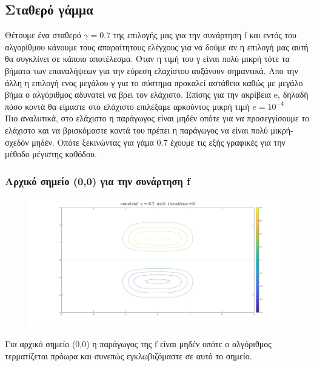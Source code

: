 \documentclass{article}
\begin{document}
\subsection*{Σταθερό γάμμα}
Θέτουμε ένα σταθερό $\boxed{γ=0.7}$ της επιλογής μας για την συνάρτηση f και εντός του αλγορίθμου κάνουμε τους απαραίτητους ελέγχους για να δούμε αν η επιλογή μας αυτή θα συγκλίνει σε κάποιο αποτέλεσμα. Όταν η τιμή του γ είναι πολύ μικρή τότε τα βήματα των επαναλήψεων για την εύρεση ελαχίστου αυξάνουν σημαντικά. Απο την άλλη η επιλογή ενος μεγάλου γ για το σύστημα προκαλεί αστάθεια καθώς με μεγάλο βήμα ο αλγόριθμος αδυνατεί να βρει τον ελάχιστο. Επίσης για την ακρίβεια e, δηλαδή πόσο κοντά θα είμαστε στο ελάχιστο επιλέξαμε αρκούντος μικρή τιμή $\boxed{e = 10^{-4}}$\\Πιο αναλυτικά, στο ελάχιστο η παράγωγος είναι μηδέν οπότε για να προσεγγίσουμε το ελάχιστο και να βρισκόμαστε κοντά του πρέπει η παράγωγος να είναι πολύ μικρή-σχεδόν μηδέν. 
Οπότε ξεκινώντας για γάμα 0.7 έχουμε τις εξής γραφικές για την μέθοδο μέγιστης καθόδου.
\clearpage
\subsubsection*{Αρχικό σημείο (0,0) για την συνάρτηση f}
\begin{figure}[h!]	
     \centering  
     \advance\leftskip-0.2cm  
  \includegraphics[width=140mm,scale=2]{t1a.jpg}
\end{figure} 
Για αρχικό σημείο (0,0) η παράγωγος της f είναι μηδέν οπότε ο αλγόριθμος τερματίζεται πρόωρα και συνεπώς εγκλωβιζόμαστε σε αυτό το σημείο.
\end{document}
